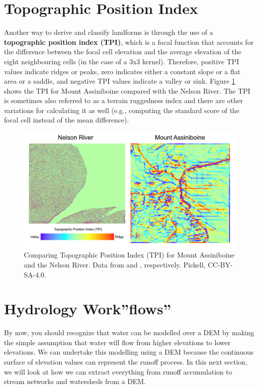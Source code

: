 \documentclass[
]{book}
\begin{document}
\section{Topographic Position Index}\label{topographic-position-index}

Another way to derive and classify landforms is through the use of a \textbf{topographic position index (TPI)}, which is a focal function that accounts for the difference between the focal cell elevation and the average elevation of the eight neighbouring cells (in the case of a 3x3 kernel). Therefore, positive TPI values indicate ridges or peaks, zero indicates either a constant slope or a flat area or a saddle, and negative TPI values indicate a valley or sink. Figure \ref{fig:9-mount-assiniboine-nelson-river-topographic-position-index} shows the TPI for Mount Assiniboine compared with the Nelson River. The TPI is sometimes also referred to as a terrain ruggedness index and there are other variations for calculating it as well (e.g., computing the standard score of the focal cell instead of the mean difference).



\begin{figure}
\includegraphics[width=0.75\linewidth]{images/09-mount-assiniboine-nelson-river-topographic-position-index} \caption{Comparing Topographic Position Index (TPI) for Mount Assiniboine and the Nelson River. Data from \citep{natural_resources_canada_canadian_2015} and \citep{maxar_precision3d_nodate}, respectively. Pickell, CC-BY-SA-4.0.}\label{fig:9-mount-assiniboine-nelson-river-topographic-position-index}
\end{figure}

\section{Hydrology Work''flows''}\label{hydrology-workflows}

By now, you should recognize that water can be modelled over a DEM by making the simple assumption that water will flow from higher elevations to lower elevations. We can undertake this modelling using a DEM because the continuous surface of elevation values can represent the runoff process. In this next section, we will look at how we can extract everything from runoff accumulation to stream networks and watersheds from a DEM.
\end{document}

